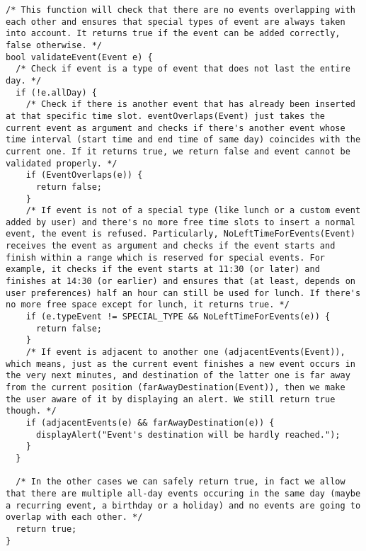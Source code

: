 \begin{tcolorbox}
\begin{verbatim}
/* This function will check that there are no events overlapping with each other and ensures that special types of event are always taken into account. It returns true if the event can be added correctly, false otherwise. */
bool validateEvent(Event e) {
  /* Check if event is a type of event that does not last the entire day. */
  if (!e.allDay) {
    /* Check if there is another event that has already been inserted at that specific time slot. eventOverlaps(Event) just takes the current event as argument and checks if there's another event whose time interval (start time and end time of same day) coincides with the current one. If it returns true, we return false and event cannot be validated properly. */
    if (EventOverlaps(e)) {
      return false;
    }
    /* If event is not of a special type (like lunch or a custom event added by user) and there's no more free time slots to insert a normal event, the event is refused. Particularly, NoLeftTimeForEvents(Event) receives the event as argument and checks if the event starts and finish within a range which is reserved for special events. For example, it checks if the event starts at 11:30 (or later) and finishes at 14:30 (or earlier) and ensures that (at least, depends on user preferences) half an hour can still be used for lunch. If there's no more free space except for lunch, it returns true. */
    if (e.typeEvent != SPECIAL_TYPE && NoLeftTimeForEvents(e)) {
      return false;
    }
    /* If event is adjacent to another one (adjacentEvents(Event)), which means, just as the current event finishes a new event occurs in the very next minutes, and destination of the latter one is far away from the current position (farAwayDestination(Event)), then we make the user aware of it by displaying an alert. We still return true though. */
    if (adjacentEvents(e) && farAwayDestination(e)) {
      displayAlert("Event's destination will be hardly reached.");
    }
  }
  
  /* In the other cases we can safely return true, in fact we allow that there are multiple all-day events occuring in the same day (maybe a recurring event, a birthday or a holiday) and no events are going to overlap with each other. */
  return true;
}
\end{verbatim}
\end{tcolorbox}

